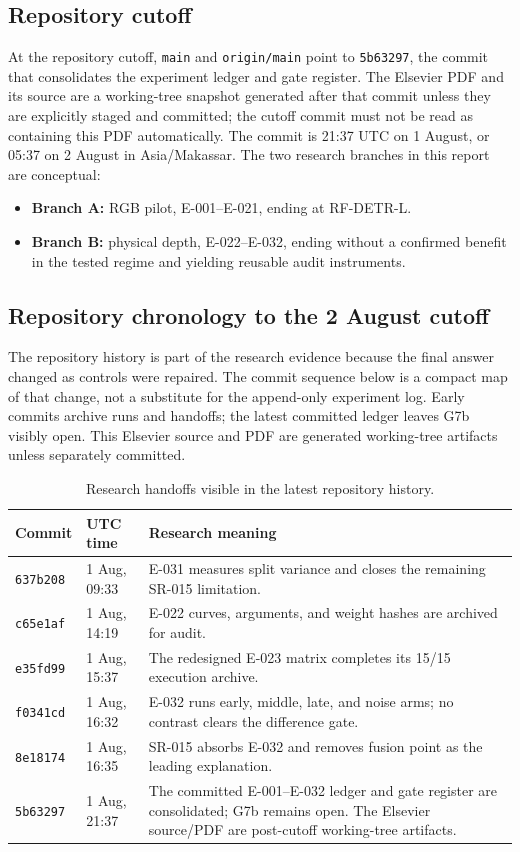 \documentclass[preprint,12pt]{elsarticle}
\begin{document}
\subsection{Repository cutoff}
At the repository cutoff, \texttt{main} and \texttt{origin/main} point to
\texttt{5b63297}, the commit that consolidates the experiment ledger and
gate register. The Elsevier PDF and its source are a working-tree snapshot
generated after that commit unless they are explicitly staged and committed;
the cutoff commit must not be read as containing this PDF automatically. The
commit is 21:37 UTC on 1 August, or 05:37 on 2 August in Asia/Makassar.
The two research branches in this report are conceptual:
\begin{itemize}
\item \textbf{Branch A:} RGB pilot, E-001--E-021, ending at RF-DETR-L.
\item \textbf{Branch B:} physical depth, E-022--E-032, ending without a
      confirmed benefit in the tested regime and yielding reusable audit
      instruments.
\end{itemize}

\subsection{Repository chronology to the 2 August cutoff}
The repository history is part of the research evidence because the final
answer changed as controls were repaired. The commit sequence below is a
compact map of that change, not a substitute for the append-only experiment
log. Early commits archive runs and handoffs; the latest committed ledger leaves
G7b visibly open. This Elsevier source and PDF are generated working-tree
artifacts unless separately committed.

\begin{table}[H]
\centering
\caption{Research handoffs visible in the latest repository history.}
\begin{tabularx}{\columnwidth}{L{0.18\columnwidth}L{0.22\columnwidth}Y}
\toprule
\textbf{Commit} & \textbf{UTC time} & \textbf{Research meaning}\\
\midrule
\texttt{637b208} & 1 Aug, 09:33 & E-031 measures split variance and closes the remaining SR-015 limitation.\\
\texttt{c65e1af} & 1 Aug, 14:19 & E-022 curves, arguments, and weight hashes are archived for audit.\\
\texttt{e35fd99} & 1 Aug, 15:37 & The redesigned E-023 matrix completes its 15/15 execution archive.\\
\texttt{f0341cd} & 1 Aug, 16:32 & E-032 runs early, middle, late, and noise arms; no contrast clears the difference gate.\\
\texttt{8e18174} & 1 Aug, 16:35 & SR-015 absorbs E-032 and removes fusion point as the leading explanation.\\
\texttt{5b63297} & 1 Aug, 21:37 & The committed E-001--E-032 ledger and gate register are consolidated; G7b remains open. The Elsevier source/PDF are post-cutoff working-tree artifacts.\\
\bottomrule
\end{tabularx}
\end{table}
\end{document}
